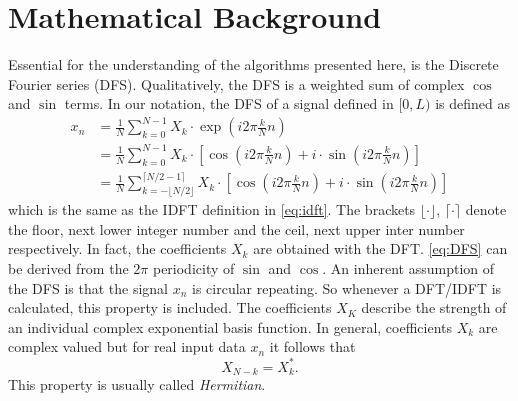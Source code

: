\documentclass{juliacon}
\begin{document}
\section{Mathematical Background}
    Essential for the understanding of the algorithms presented here, is the Discrete Fourier series (DFS).
    Qualitatively, the DFS is a weighted sum of complex $\cos$ and $\sin$ terms.
    In our notation, the DFS of a signal defined in $[0, L)$ is defined as
    \begin{align}
        x_n &= \frac1{N}\sum_{k=0}^{N-1} X_k \cdot \exp\left(i2\pi \frac{k}{N} n \right) \\
        &= \frac1{N}\sum_{k=0}^{N-1} X_k \cdot \left[ \cos\left(i2\pi \frac{k}{N} n \right) + i \cdot  \sin\left(i2\pi \frac{k}{N} n \right) \right]\label{eq:DFS2}\\
        &=\frac1{N}\sum_{k=-\lfloor N/2\rfloor}^{\lceil N/2 -1 \rceil} X_k \cdot \left[ \cos\left(i2\pi \frac{k}{N} n \right) + i \cdot  \sin\left(i2\pi \frac{k}{N} n \right) \right]\label{eq:DFS}
    \end{align}
    which is the same as the IDFT definition in \autoref{eq:idft}.
    The brackets $\lfloor \cdot \rfloor$, $\lceil \cdot \rceil$ denote the floor, next lower integer number and the ceil, next upper inter number respectively. In fact, the coefficients $X_k$ are obtained with the DFT.
    \autoref{eq:DFS} can be derived from the $2\pi$ periodicity of $\sin$ and $\cos$.
    An inherent assumption of the DFS is that the signal $x_n$ is circular repeating.
    So whenever a DFT/IDFT is calculated, this property is included.
    The coefficients $X_K$ describe the strength of an individual complex
    exponential basis function.
    In general, coefficients $X_k$ are complex valued but for real input data $x_n$ it follows that
    \begin{equation}
        X_{N-k} = X_k^*.
        \label{eq:symmetry}
    \end{equation}
    This property is usually called \textit{Hermitian}.
\end{document}
